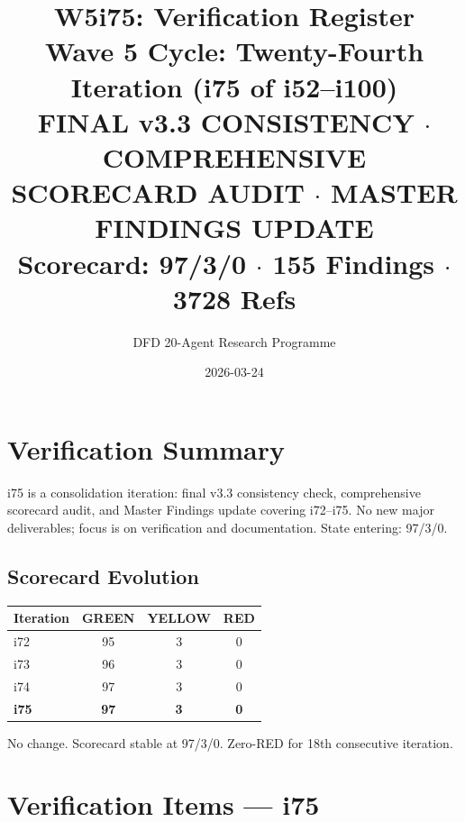\documentclass[11pt,a4paper]{article}
\title{\Large W5i75: Verification Register\\[6pt]
\normalsize Wave 5 Cycle: Twenty-Fourth Iteration (i75 of i52--i100)\\[6pt]
FINAL v3.3 CONSISTENCY $\cdot$ COMPREHENSIVE SCORECARD AUDIT $\cdot$ MASTER FINDINGS UPDATE\\[4pt]
Scorecard: 97/3/0 $\cdot$ 155 Findings $\cdot$ 3728 Refs}
\author{DFD 20-Agent Research Programme}
\date{2026-03-24}
\begin{document}
\maketitle

\section{Verification Summary}

i75 is a consolidation iteration: final v3.3 consistency check, comprehensive scorecard audit, and Master Findings update covering i72--i75. No new major deliverables; focus is on verification and documentation. State entering: 97/3/0.

\subsection{Scorecard Evolution}

\begin{center}
\begin{tabular}{lccc}
\toprule
\textbf{Iteration} & \textbf{GREEN} & \textbf{YELLOW} & \textbf{RED} \\
\midrule
i72 & 95 & 3 & 0 \\
i73 & 96 & 3 & 0 \\
i74 & 97 & 3 & 0 \\
\textbf{i75} & \textbf{97} & \textbf{3} & \textbf{0} \\
\bottomrule
\end{tabular}
\end{center}

No change. Scorecard stable at 97/3/0. Zero-RED for 18th consecutive iteration.

\section{Verification Items --- i75}
\end{document}
